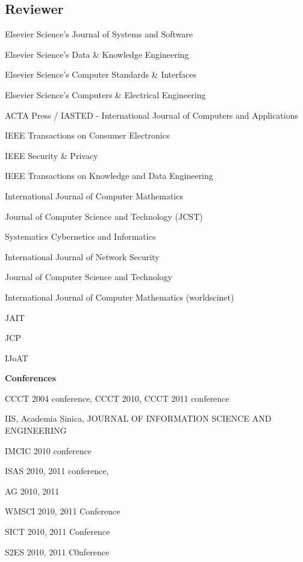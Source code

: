 \documentclass[letterpaper]{article}
\renewenvironment{itemize}{
  \begin{list}{}{
    \setlength{\leftmargin}{1.5em}
  }
}{
  \end{list}
}
\begin{document}
\subsection*{Reviewer}
\begin{itemize}
\item Elsevier Science's Journal of Systems and Software
\item Elsevier Science's Data \& Knowledge Engineering  
\item Elsevier Science's Computer Standards \& Interfaces
\item Elsevier Science's Computers \& Electrical Engineering
\item ACTA Press / IASTED - International Journal of Computers and Applications
\item IEEE Transactions on Consumer Electronics
\item IEEE Security \& Privacy
\item IEEE Transactions on Knowledge and Data Engineering
\item International Journal of Computer Mathematics
\item Journal of Computer Science and Technology (JCST)
\item Systematics Cybernetics and Informatics
\item International Journal of Network Security 
\item Journal of Computer Science and Technology 
\item International Journal of Computer Mathematics (worldscinet)
\item JAIT
\item JCP
\item IJoAT 
\item \textbf{Conferences}
	\begin{itemize}
	\item CCCT 2004 conference, CCCT 2010, CCCT 2011 conference
	\item IIS, Academia Sinica, JOURNAL OF INFORMATION SCIENCE AND ENGINEERING
	\item IMCIC 2010 conference
  \item ISAS 2010, 2011 conference, 
  \item AG 2010, 2011
  \item WMSCI 2010, 2011 Conference
  \item SICT 2010, 2011 Conference
  \item S2ES 2010, 2011 C0nference
	\end{itemize}
\end{itemize}
\end{document}
